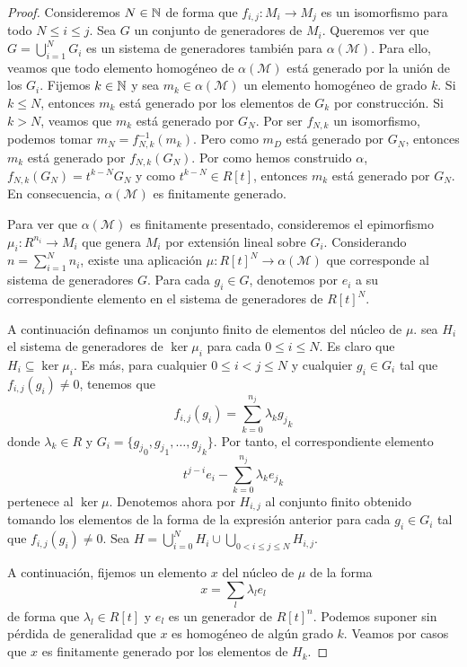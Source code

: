 \begin{proof}
	Consideremos \(N \in \mathbb{N}\) de forma que \(f_{i,j} : M_i \to M_j\) es un isomorfismo para todo \(N \leq i \leq j\). Sea \(G\) un conjunto de generadores de \(M_i\). Queremos ver que \(G = \bigcup_{i=1}^N G_i\) es un sistema de generadores también para \(\alpha(\mathcal{M})\). Para ello, veamos que todo elemento homogéneo de \(\alpha(\mathcal{M})\) está generado por la unión de los \(G_i\). Fijemos \(k \in \mathbb{N}\) y sea \(m_k \in \alpha(\mathcal{M})\) un elemento homogéneo de grado \(k\). Si \(k \leq N\), entonces \(m_k\) está generado por los elementos de \(G_k\) por construcción. Si \(k > N\), veamos que \(m_k\) está generado por \(G_N\). Por ser \(f_{N,k}\) un isomorfismo, podemos tomar \(m_N = f^{-1}_{N,k}(m_k)\). Pero como \(m_D\) está generado por \(G_N\), entonces \(m_k\) está generado por \(f_{N,k}(G_N)\). Por como hemos construido \(\alpha\), \(f_{N,k}(G_N) = t^{k-N}G_N\) y como \(t^{k-N} \in R[t]\), entonces \(m_k\) está generado por \(G_N\). En consecuencia, \(\alpha(\mathcal{M})\) es finitamente generado.
	
	Para ver que \(\alpha(\mathcal{M})\) es finitamente presentado, consideremos el epimorfismo \(\mu_i : R^{n_i} \to M_i\) que genera \(M_i\) por extensión lineal sobre \(G_i\). Considerando \(n = \sum_{i=1}^N n_i\), existe una aplicación \(\mu : R[t]^N \to \alpha(\mathcal{M})\) que corresponde al sistema de generadores \(G\). Para cada \(g_i \in G\), denotemos por \(e_i\) a su correspondiente elemento en el sistema de generadores de \(R[t]^N\).
	
	A continuación definamos un conjunto finito de elementos del núcleo de \(\mu\). sea \(H_i\) el sistema de generadores de \(\ker \mu_i\) para cada \(0 \leq i \leq N\). Es claro que \(H_i \subseteq \ker \mu_i\). Es más, para cualquier \(0 \leq i < j \leq N\) y cualquier \(g_i \in G_i\) tal que \(f_{i,j}(g_i) \neq 0\), tenemos que 
	\[
		f_{i,j}(g_i) = \sum_{k=0}^{n_j} \lambda_k {g_j}_k
	\]
	donde \(\lambda_k \in R\) y \(G_i = \{ {g_j}_0, {g_j}_1, \ldots, {g_j}_k \}\). Por tanto, el correspondiente elemento 
	\[
		t^{j-i}e_i - \sum_{k=0}^{n_j} \lambda_k {e_j}_k
	\]
	pertenece al \(\ker \mu\). Denotemos ahora por \(H_{i,j}\) al conjunto finito obtenido tomando los elementos de la forma de la expresión anterior para cada \(g_i \in G_i\) tal que \(f_{i,j}(g_i) \neq 0\). Sea \(H = \bigcup_{i=0}^N H_i \cup \bigcup_{0 < i \leq j \leq N} H_{i,j}\).
	
	A continuación, fijemos un elemento \(x\) del núcleo de \(\mu\) de la forma
	\[
		x = \sum_l \lambda_l e_l
	\] de forma que \(\lambda_l \in R[t]\) y \(e_l\) es un generador de \(R[t]^n\). Podemos suponer sin pérdida de generalidad que \(x\) es homogéneo de algún grado \(k\). Veamos por casos que \(x\) es finitamente generado por los elementos de \(H_k\).
	

\end{proof}

